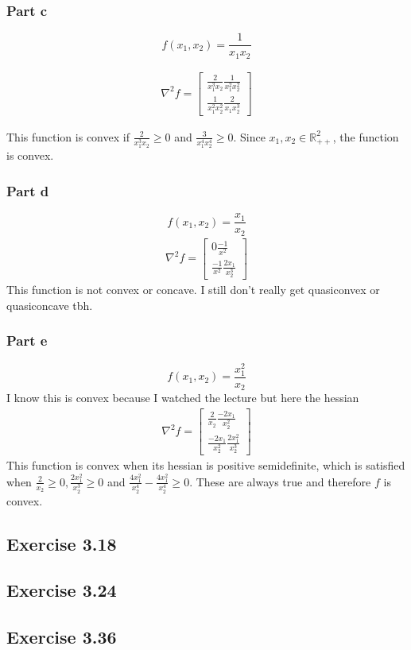 \subsubsection{Part c}
\begin{equation}
  f(x_1, x_2) = \frac{1}{x_1 x_2}
\end{equation}

\begin{align}
  \nabla^2 f =
  \begin{bmatrix}
     \frac{2}{x_1^3 x_2} \frac{1}{x_1^2 x_2^2} \\
     \frac{1}{x_1^2 x_2^2} \frac{2}{x_1 x_2^3}
  \end{bmatrix}
\end{align}

This function is convex if $\frac{2}{x_1^3 x_2} \geq 0$ and $\frac{3}{x_1^4 x_2^4} \geq 0$. Since $x_1,x_2 \in \mathbb{R}_{++}^2$, the function is convex.

\subsubsection{Part d}
\begin{equation}
  f(x_1, x_2) = \frac{x_1}{x_2}
\end{equation}
\begin{align}
  \nabla^2 f =
  \begin{bmatrix}
     0 \frac{-1}{x^2} \\
     \frac{-1}{x^2} \frac{2x_1}{x_2^3}
  \end{bmatrix}
\end{align}
This function is not convex or concave. I still don't really get quasiconvex or quasiconcave tbh.

\subsubsection{Part e}
\begin{equation}
  f(x_1, x_2) = \frac{x_1^2}{x_2}
\end{equation}
I know this is convex because I watched the lecture but here the hessian
\begin{align}
  \nabla^2 f = 
  \begin{bmatrix}
     \frac{2}{x_2} \frac{-2x_1}{x_2^2} \\
     \frac{-2x_1}{x_2^2} \frac{2x_1^2}{x_2^3}
  \end{bmatrix}
\end{align}
This function is convex when its hessian is positive semidefinite, which is satisfied when $\frac{2}{x_2} \geq 0, \frac{2x_1^2}{x_2^3} \geq 0$ and $\frac{4x_1^2}{x_2^4}   - \frac{4x_1^2}{x_2^4}  \geq 0$. These are always true and therefore $f$ is convex.

\subsection{Exercise 3.18}

\subsection{Exercise 3.24}

\subsection{Exercise 3.36}

